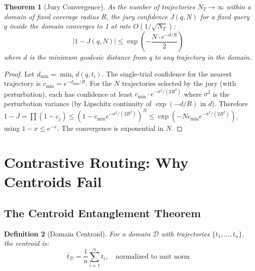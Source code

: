 \documentclass[11pt]{article}
\newtheorem{theorem}{Theorem}[section]
\newtheorem{definition}[theorem]{Definition}
\begin{document}
\begin{theorem}[Jury Convergence]\label{thm:convergence}
As the number of trajectories $N_T \to \infty$ within a domain of fixed coverage radius $R$, the jury confidence $J(q,N)$ for a fixed query $q$ inside the domain converges to 1 at rate $O(1/\sqrt{N_T})$:
\begin{equation}
|1 - J(q, N)| \le \exp\left(-\frac{N \cdot e^{-d/R}}{2}\right)
\end{equation}
where $d$ is the minimum geodesic distance from $q$ to any trajectory in the domain.
\end{theorem}
\begin{proof}
Let $d_{\min} = \min_i d(q, t_i)$. The single-trial confidence for the nearest trajectory is $c_{\min} = e^{-d_{\min}/R}$. For the $N$ trajectories selected by the jury (with perturbation), each has confidence at least $c_{\min} \cdot e^{-\sigma^2/(2R^2)}$ where $\sigma^2$ is the perturbation variance (by Lipschitz continuity of $\exp(-d/R)$ in $d$). Therefore $1 - J = \prod(1-c_j) \le (1 - c_{\min}e^{-\sigma^2/(2R^2)})^N \le \exp(-N c_{\min} e^{-\sigma^2/(2R^2)})$, using $1-x \le e^{-x}$. The convergence is exponential in $N$.
\end{proof}

\newpage
\section{Contrastive Routing: Why Centroids Fail}

\subsection{The Centroid Entanglement Theorem}

\begin{definition}[Domain Centroid]
For a domain $\mathcal{D}$ with trajectories $\{t_1,\ldots,t_n\}$, the centroid is:
\begin{equation}
\bar{t}_{\mathcal{D}} = \frac{1}{n}\sum_{i=1}^{n} t_i, \quad \text{normalized to unit norm}
\end{equation}
\end{definition}
\end{document}
